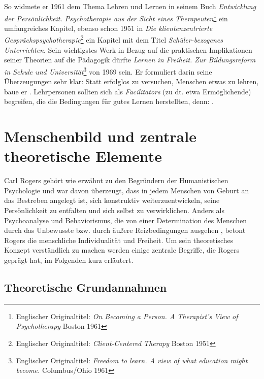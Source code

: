 \documentclass[
  twoside,
  parskip=half-,
]{scrreprt}
\begin{document}
So widmete er 1961 dem Thema Lehren und Lernen in seinem Buch \textit{Entwicklung der Persönlichkeit. Psychotherapie aus der Sicht eines Therapeuten}\footnote{Englischer Originaltitel: \textit{On Becoming a Person. A Therapist's View of Psychotherapy} Boston 1961} ein umfangreiches Kapitel, ebenso schon 1951 in \textit{Die klientenzentrierte Gesprächspsychotherapie}\footnote{Englischer Originaltitel: \textit{Client-Centered Therapy} Boston 1951} ein Kapitel mit dem Titel \textit{Schüler-bezogenes Unterrichten}. Sein wichtigstes Werk in Bezug auf die praktischen Implikationen seiner Theorien auf die Pädagogik dürfte \textit{Lernen in Freiheit. Zur Bildungsreform in Schule und Universität}\footnote{Englischer Originaltitel: \textit{Freedom to learn. A view of what education might become.} Columbus/Ohio 1961} von 1969 sein.  Er formuliert darin seine Überzeugungen sehr klar:  Statt erfolglos zu versuchen, Menschen etwas zu lehren, baue er . Lehrpersonen sollten sich als \textit{Facilitators} (zu dt. etwa Ermöglichende) begreifen, die die Bedingungen für gutes Lernen herstellten, denn: .

\section{Menschenbild und zentrale theoretische Elemente}

Carl Rogers gehört wie erwähnt zu den Begründern der Humanistischen Psychologie und war davon überzeugt, dass in jedem Menschen von Geburt an das Bestreben angelegt ist, sich konstruktiv weiterzuentwickeln, seine Persönlichkeit zu entfalten und sich selbst zu verwirklichen. Anders als Psychoanalyse und Behaviorismus, die von einer Determination des Menschen durch das Unbewusste bzw. durch äußere Reizbedingungen ausgehen \autocite[vgl.][35]{weinberger}, betont Rogers die menschliche Individualität und Freiheit. Um sein theoretisches Konzept verständlich zu machen werden einige zentrale Begriffe, die Rogers geprägt hat, im Folgenden kurz erläutert.

\subsection{Theoretische Grundannahmen}
\end{document}
